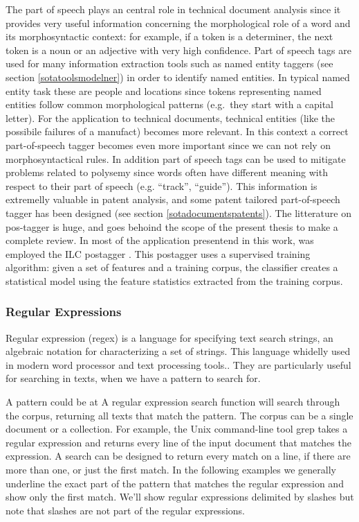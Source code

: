 \documentclass[]{book}
\begin{document}
The part of speech plays an central role in technical document analysis
since it provides very useful information concerning the morphological
role of a word and its morphosyntactic context: for example, if a token
is a determiner, the next token is a noun or an adjective with very high
confidence. Part of speech tags are used for many information extraction
tools such as named entity taggers (see section \ref{sotatoolsmodelner})
in order to identify named entities. In typical named entity task these
are people and locations since tokens representing named entities follow
common morphological patterns (e.g.~they start with a capital letter).
For the application to technical documents, technical entities (like the
possibile failures of a manufact) becomes more relevant. In this context
a correct part-of-speech tagger becomes even more important since we can
not rely on morphosyntactical rules. In addition part of speech tags can
be used to mitigate problems related to polysemy since words often have
different meaning with respect to their part of speech (e.g. ``track'',
``guide''). This information is extremelly valuable in patent analysis,
and some patent tailored part-of-speech tagger has been designed (see
section \ref{sotadocumentspatents}). The litterature on pos-tagger is
huge, and goes behoind the scope of the present thesis to make a
complete review. In most of the application presentend in this work, was
employed the ILC postagger \citep{attardi2006experiments}. This
postagger uses a supervised training algorithm: given a set of features
and a training corpus, the classifier creates a statistical model using
the feature statistics extracted from the training corpus.

\subsubsection{Regular Expressions}\label{sotatoolstransformregex}

Regular expression (regex) is a language for specifying text search
strings, an algebraic notation for characterizing a set of strings. This
language whidelly used in modern word processor and text processing
tools.. They are particularly useful for searching in texts, when we
have a pattern to search for.

A pattern could be at A regular expression search function will search
through the corpus, returning all texts that match the pattern. The
corpus can be a single document or a collection. For example, the Unix
command-line tool grep takes a regular expression and returns every line
of the input document that matches the expression. A search can be
designed to return every match on a line, if there are more than one, or
just the first match. In the following examples we generally underline
the exact part of the pattern that matches the regular expression and
show only the first match. We'll show regular expressions delimited by
slashes but note that slashes are not part of the regular expressions.
\end{document}
